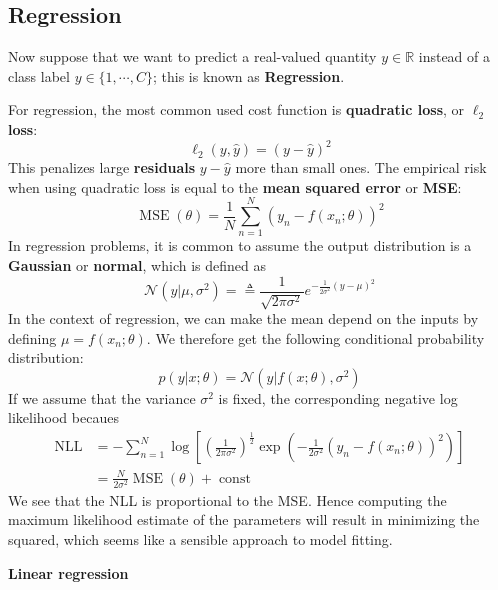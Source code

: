 \subsection{Regression}
Now suppose that we want to predict a real-valued quantity $y\in \mathbb{R}$ instead of a class label $y\in \{1,\cdots,C\}$; this is known as \textbf{Regression}.
\par
For regression, the most common used cost function is \textbf{quadratic loss}, or $\ell_2$ \textbf{loss}:
\begin{equation}
\ell_2(y,\hat{y}) = (y-\hat{y})^2
\end{equation}
This penalizes large \textbf{residuals} $y-\hat{y}$ more than small ones. The empirical risk when using quadratic loss is equal to the \textbf{mean squared error} or \textbf{MSE}:
\begin{equation}
\operatorname{MSE}(\theta) = \frac{1}{N}\sum_{n=1}^N(y_n-f(x_n;\theta))^2
\end{equation}
In regression problems, it is common to assume the output distribution is a \textbf{Gaussian} or \textbf{normal}, which is defined as
\begin{equation}
\mathcal{N}(y|\mu, \sigma^2) = \triangleq \frac{1}{\sqrt{2\pi\sigma^2}}e^{-\frac{1}{2\sigma^2}(y-\mu)^2}
\end{equation}
In the context of regression, we can make the mean depend on the inputs by defining $\mu = f(x_n;\theta)$. We therefore get the following conditional probability distribution:
\begin{equation}
p(y|x;\theta) = \mathcal{N}(y|f(x;\theta),\sigma^2)
\end{equation}
If we assume that the variance $\sigma^2$ is fixed, the corresponding negative log likelihood becaues
\begin{equation}
\begin{aligned}
\operatorname{NLL} &= -\sum_{n=1}^N\log[(\frac{1}{2\pi\sigma^2})^{\frac{1}{2}}\exp(-\frac{1}{2\sigma^2}(y_n-f(x_n;\theta))^2)]\\
&= \frac{N}{2\sigma^2}\operatorname{MSE}(\theta) + \operatorname{const}
\end{aligned}
\end{equation}
We see that the NLL is proportional to the MSE. Hence computing the maximum likelihood estimate of the parameters will result in minimizing the squared, which seems like a sensible approach to model fitting.
~\\
\par
\noindent
\textbf{Linear regression}	
